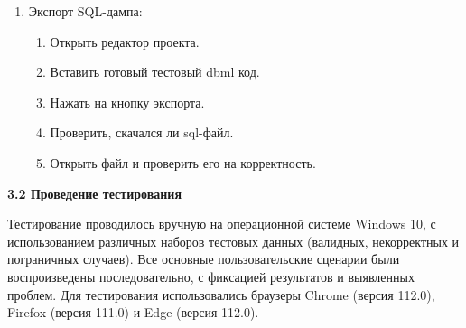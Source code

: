 \begin{enumerate}
 \item Экспорт SQL-дампа:
    \begin{enumerate}
        \item Открыть редактор проекта.
        \item Вставить готовый тестовый dbml код.
        \item Нажать на кнопку экспорта.
        \item Проверить, скачался ли sql-файл.
        \item Открыть файл и проверить его на корректность.
    \end{enumerate}
    
\end{enumerate}


\textbf{3.2 Проведение тестирования}

Тестирование проводилось вручную на операционной системе Windows 10, с использованием различных наборов тестовых данных (валидных, некорректных и пограничных случаев). Все основные пользовательские сценарии были воспроизведены последовательно, с фиксацией результатов и выявленных проблем. Для тестирования использовались браузеры Chrome (версия 112.0), Firefox (версия 111.0) и Edge (версия 112.0).


